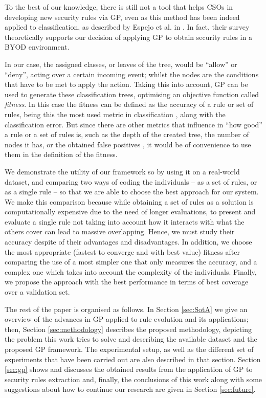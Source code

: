 \documentclass[runningheads]{llncs}
\begin{document}
To the best of our knowledge, there is still not a tool that helps CSOs in
developing new security rules via GP, even as this method has been
indeed applied to classification, as described by Espejo et al. in
\cite{espejo2010survey}. In fact, their survey theoretically supports our
decision of applying GP to obtain security rules in a BYOD
environment.

In our case, the assigned classes, or leaves of the tree, would be ``allow''
or ``deny'', acting over a certain incoming event; whilst the nodes
are the conditions that have to be met to apply the action. Taking
this into account, GP can be used to generate these classification
trees, optimising an objective function called {\em fitness}. In this case the
fitness can be defined as the accuracy of a rule or set of rules, being this the most
used metric in classification \cite{witten2005data}, along with the
classification error. But since there are other metrics that influence in
``how good'' a rule or a set of rules is, such as the depth of the
created tree, the number of nodes it has, or the obtained false positives
\cite{back1996evolutionary}, it would be of convenience to use them in
the definition of the fitness. 

We demonstrate the utility of our framework so by using it on a
real-world dataset, and comparing two 
ways of coding the individuals -- as a set of rules, or as a single
rule -- so that we are able to choose the best approach for our
system. We make this comparison because while obtaining a set of rules
as a solution is computationally expensive due to the need of longer
evaluations, to present and evaluate a single rule not taking into
account how it interacts with what the others cover
\cite{freitas2002data} can lead to massive overlapping. Hence, we must
study their accuracy despite of their advantages and disadvantages. In
addition, we choose the most appropriate (fastest to converge and with
best value) fitness after comparing the use of a most simpler one that
only measures the accuracy, and a complex one which takes into account
the complexity of the individuals. Finally, we propose the approach
with the best performance in terms of best coverage over a validation
set.

The rest of the paper is organised as follows. In Section
\ref{sec:SotA} we give an overview of the advances in GP applied to
rule evolution and its applications; then, Section
\ref{sec:methodology} describes the proposed methodology, depicting
the problem this work tries to solve and describing the available
dataset and the proposed GP framework. The experimental setup, as %
well as the different set of experiments that have been carried out
are also described in that section. Section \ref{sec:gp} shows and discusses the
obtained results from the application of GP to security rules
extraction and, finally, the conclusions of this work along with some
suggestions about how to continue our research are given in Section
\ref{sec:future}.
\end{document}
